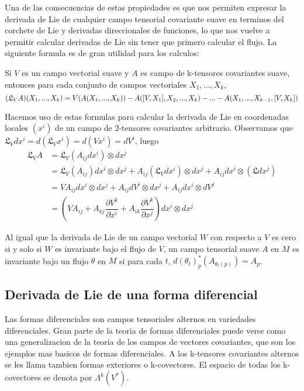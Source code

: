 \documentclass[12pt]{extarticle}
\newcommand{\<}{\langle}
\renewcommand{\>}{\rangle}
\theoremstyle{definition}
\begin{document}
Una de las consecuencias de estas propiedades es que nos permiten expresar la
derivada de Lie de cualquier campo tensorial covariante suave en terminos del
corchete de Lie y derivadas direccionales de funciones, lo que nos vuelve a
permitir calcular derivadas de Lie sin tener que primero calcular el flujo. La
siguiente formula es de gran utilidad para los calculos:

Si $V$ es un campo vectorial suave y $A$ es campo de k-tensores covariantes
suave, entonces para cada conjunto de campos vectoriales $X_1, ..., X_k$,
\begin{equation*}
	(\mathfrak{L}_VA)(X_1,...,X_k) = V(A(X_1,..., X_k)) - A([V, X_1], X_2,..., X_k) - ... - \\
	A(X_1,..., X_{k-1}, [V, X_k])
\end{equation*}

Hacemos uso de estas formulas para calcular la derivada de Lie
en coordenadas locales $(x^i)$ de un campo de 2-tensores covariantes arbitrario.
Observamos que $\mathfrak{L}_Vdx^i=d(\mathfrak{L}_Vx^i) = d(Vx^i) = dV^i$, luego
\begin{equation*}
\begin{split}
	\mathfrak{L}_VA & = \mathfrak{L}_V(A_{ij}dx^i) \otimes dx^j \\
	& = \mathfrak{L}_V(A_{ij})dx^i \otimes dx^j + A_{ij}(\mathfrak{L}_Vdx^i) \otimes dx^j + A_{ij}dx^i \otimes (\mathfrak{L}dx^j) \\
	& = VA_{ij}dx^i \otimes dx^j + A_{ij} dV^i \otimes dx^j + A_{ij}dx^i \otimes dV^j \\
	& = (V A_{ij} + A_{kj} \dfrac{\partial V^k}{\partial x^i} + A_{ik}\dfrac{\partial V^k}{\partial x^j}) dx^i \otimes dx^j
\end{split}
\end{equation*}

Al igual que la derivada de Lie de un campo vectorial $W$ con respecto a $V$ es
cero si y solo si $W$ es invariante bajo el flujo de $V$, un campo tensorial suave $A$
en $M$ es invariante bajo un flujo $\theta$ en $M$ si para cada $t$,
$d(\theta_t)^*_p(A_{\theta_t(p)}) = A_p$.

\subsection{Derivada de Lie de una forma diferencial}
Las formas diferenciales son campos tensoriales alternos en variedades
diferenciales. Gran parte de la teoria de formas diferenciales puede verse como
una generalizacion de la teoria de los campos de vectores covariantes, que son
los ejemplos mas basicos de formas diferenciales. A los k-tensores covariantes
alternos se les llama tambien formas exteriores o k-covectores. El espacio de
todas los k-covectores se denota por $\Lambda^k(V^*)$.
\end{document}

